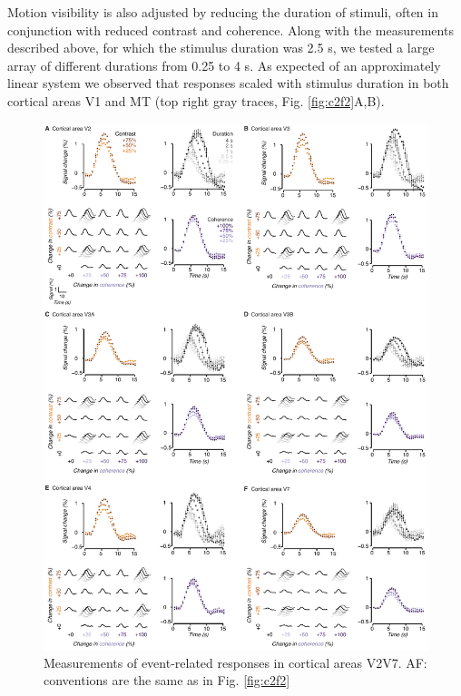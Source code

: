 Motion visibility is also adjusted by reducing the duration of stimuli, often in conjunction with reduced contrast and coherence. Along with the measurements described above, for which the stimulus duration was 2.5 s, we tested a large array of different durations from 0.25 to 4 s. As expected of an approximately linear system \citep{Boynton2012-xy} we observed that responses scaled with stimulus duration in both cortical areas V1 and MT (top right gray traces, Fig. \ref{fig:c2f2}A,B).

\begin{figure}
\centering
\includegraphics[keepaspectratio,width=\textwidth]{figs_c2/Fig3_v2v7.pdf}
\caption[Measurements of event-related responses in cortical areas V2\textemdash V7]{Measurements of event-related responses in cortical areas V2\textemdash V7. A\textemdash F: conventions are the same as in Fig. \ref{fig:c2f2}}
\label{fig:c2f3}
\end{figure}

